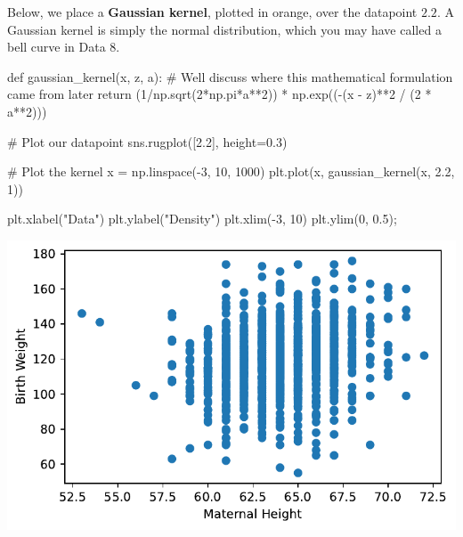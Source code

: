 \documentclass[
  letterpaper,
  DIV=11,
  numbers=noendperiod]{scrreprt}
\newenvironment{Shaded}{\begin{snugshade}}{\end{snugshade}}
\newcommand{\CommentTok}[1]{\textcolor[rgb]{0.37,0.37,0.37}{#1}}
\newcommand{\ControlFlowTok}[1]{\textcolor[rgb]{0.00,0.23,0.31}{#1}}
\newcommand{\DecValTok}[1]{\textcolor[rgb]{0.68,0.00,0.00}{#1}}
\newcommand{\FloatTok}[1]{\textcolor[rgb]{0.68,0.00,0.00}{#1}}
\newcommand{\KeywordTok}[1]{\textcolor[rgb]{0.00,0.23,0.31}{#1}}
\newcommand{\NormalTok}[1]{\textcolor[rgb]{0.00,0.23,0.31}{#1}}
\newcommand{\OperatorTok}[1]{\textcolor[rgb]{0.37,0.37,0.37}{#1}}
\newcommand{\StringTok}[1]{\textcolor[rgb]{0.13,0.47,0.30}{#1}}
\begin{document}
Below, we place a \textbf{Gaussian kernel}, plotted in orange, over the
datapoint \(2.2\). A Gaussian kernel is simply the normal distribution,
which you may have called a bell curve in Data 8.

\begin{Shaded}
\begin{Highlighting}[]
\KeywordTok{def}\NormalTok{ gaussian\_kernel(x, z, a):}
    \CommentTok{\# We\textquotesingle{}ll discuss where this mathematical formulation came from later}
    \ControlFlowTok{return}\NormalTok{ (}\DecValTok{1}\OperatorTok{/}\NormalTok{np.sqrt(}\DecValTok{2}\OperatorTok{*}\NormalTok{np.pi}\OperatorTok{*}\NormalTok{a}\OperatorTok{**}\DecValTok{2}\NormalTok{)) }\OperatorTok{*}\NormalTok{ np.exp((}\OperatorTok{{-}}\NormalTok{(x }\OperatorTok{{-}}\NormalTok{ z)}\OperatorTok{**}\DecValTok{2} \OperatorTok{/}\NormalTok{ (}\DecValTok{2} \OperatorTok{*}\NormalTok{ a}\OperatorTok{**}\DecValTok{2}\NormalTok{)))}

\CommentTok{\# Plot our datapoint}
\NormalTok{sns.rugplot([}\FloatTok{2.2}\NormalTok{], height}\OperatorTok{=}\FloatTok{0.3}\NormalTok{)}

\CommentTok{\# Plot the kernel}
\NormalTok{x }\OperatorTok{=}\NormalTok{ np.linspace(}\OperatorTok{{-}}\DecValTok{3}\NormalTok{, }\DecValTok{10}\NormalTok{, }\DecValTok{1000}\NormalTok{)}
\NormalTok{plt.plot(x, gaussian\_kernel(x, }\FloatTok{2.2}\NormalTok{, }\DecValTok{1}\NormalTok{))}

\NormalTok{plt.xlabel(}\StringTok{"Data"}\NormalTok{)}
\NormalTok{plt.ylabel(}\StringTok{"Density"}\NormalTok{)}
\NormalTok{plt.xlim(}\OperatorTok{{-}}\DecValTok{3}\NormalTok{, }\DecValTok{10}\NormalTok{)}
\NormalTok{plt.ylim(}\DecValTok{0}\NormalTok{, }\FloatTok{0.5}\NormalTok{)}\OperatorTok{;}
\end{Highlighting}
\end{Shaded}

\includegraphics{visualization_2/visualization_2_files/figure-pdf/cell-7-output-1.pdf}
\end{document}
